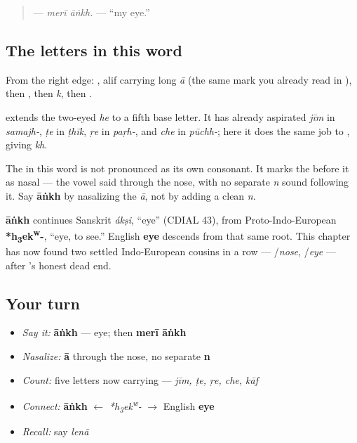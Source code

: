 \begin{quote}
\textbf{ } — \emph{merī āṅkh.} — \textquotedblleft{}my eye.\textquotedblright{}
\end{quote}

\subsection*{The letters in this word}
From the right edge: \textbf{}, alif carrying long \emph{ā} (the same mark you already read in \textbf{}), then \textbf{}, then \textbf{} \emph{k}, then \textbf{}.

\textbf{} extends the two-eyed \emph{he} to a fifth base letter. It has already aspirated \emph{jīm} in \emph{samajh-}, \emph{ṭe} in \emph{ṭhīk}, \emph{ṛe} in \emph{paṛh-}, and \emph{che} in \emph{pūchh-}; here it does the same job to \textbf{}, giving \emph{kh}.

The \textbf{} in this word is not pronounced as its own consonant. It marks the \textbf{} before it as nasal — the vowel said through the nose, with no separate \emph{n} sound following it. Say \textbf{āṅkh} by nasalizing the \emph{ā}, not by adding a clean \emph{n}.

\begin{cousinweb}
\textbf{āṅkh} continues Sanskrit \emph{ákṣi}, \textquotedblleft{}eye\textquotedblright{} (CDIAL 43), from Proto-Indo-European \textbf{*h\textsubscript{3}ek\textsuperscript{w}-}, \textquotedblleft{}eye, to see.\textquotedblright{} English \textbf{eye} descends from that same root. This chapter has now found two settled Indo-European cousins in a row — \textbf{}/\emph{nose}, \textbf{}/\emph{eye} — after \textbf{}'s honest dead end.
\end{cousinweb}

\subsection*{Your turn}
\begin{itemize}
\raggedright
  \item \emph{Say it:} \textbf{āṅkh} — eye; then \textbf{merī āṅkh}
  \item \emph{Nasalize:} \textbf{ā} through the nose, no separate \textbf{n}
  \item \emph{Count:} five letters now carrying \textbf{} — \emph{jīm, ṭe, ṛe, che, kāf}
  \item \emph{Connect:} \textbf{āṅkh} $\leftarrow$ \emph{*h\textsubscript{3}ek\textsuperscript{w}-} $\to$ English \textbf{eye}
  \item \emph{Recall:} say \emph{lenā}
\end{itemize}

